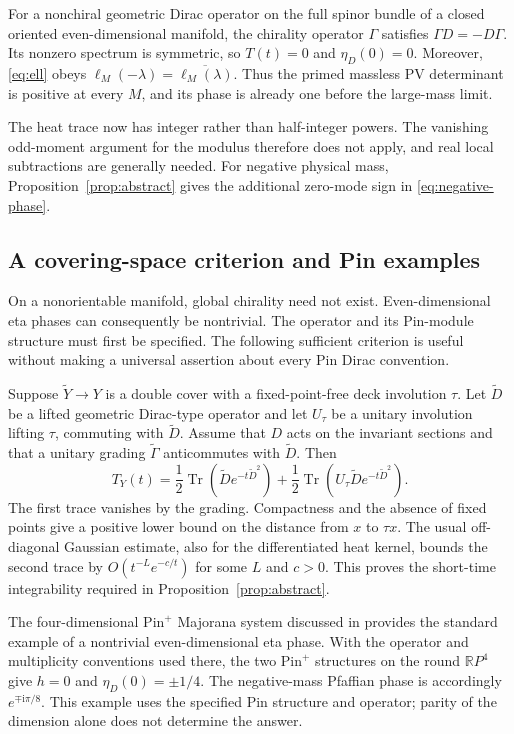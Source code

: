 \documentclass[11pt,a4paper]{article}
\theoremstyle{remark}
\DeclareMathOperator{\Tr}{Tr}
\newcommand{\ii}{\mathrm i}
\newcommand{\R}{\mathbb R}
\numberwithin{equation}{section}
\begin{document}
For a nonchiral geometric Dirac operator on the full spinor bundle
of a closed oriented even-dimensional manifold, the chirality
operator $\Gamma$ satisfies $\Gamma D=-D\Gamma$. Its nonzero
spectrum is symmetric, so $T(t)=0$ and $\eta_D(0)=0$.
Moreover, \eqref{eq:ell} obeys
$\ell_M(-\lambda)=\overline{\ell_M(\lambda)}$.
Thus the primed massless PV determinant is positive at every $M$,
and its phase is already one before the large-mass limit.

The heat trace now has integer rather than half-integer powers.
The vanishing odd-moment argument for the modulus therefore does
not apply, and real local subtractions are generally needed.
For negative physical mass, Proposition~\ref{prop:abstract} gives
the additional zero-mode sign in \eqref{eq:negative-phase}.

\subsection{A covering-space criterion and Pin examples}

On a nonorientable manifold, global chirality need not exist.
Even-dimensional eta phases can consequently be nontrivial.
The operator and its Pin-module structure must first be specified.
The following sufficient criterion is useful without making a
universal assertion about every Pin Dirac convention.

Suppose $\widetilde Y\to Y$ is a double cover with a fixed-point-free
deck involution $\tau$. Let $\widetilde D$ be a lifted geometric
Dirac-type operator and let $U_\tau$ be a unitary involution lifting
$\tau$, commuting with $\widetilde D$. Assume that $D$ acts on the
invariant sections and that a unitary grading
$\widetilde\Gamma$ anticommutes with $\widetilde D$. Then
\begin{equation}\label{eq:cover-trace}
 T_Y(t)=\frac12\Tr(\widetilde D e^{-t\widetilde D^2})
       +\frac12\Tr(U_\tau\widetilde D e^{-t\widetilde D^2}).
\end{equation}
The first trace vanishes by the grading. Compactness and the absence
of fixed points give a positive lower bound on the distance from
$x$ to $\tau x$. The usual off-diagonal Gaussian estimate, also for
the differentiated heat kernel, bounds the second trace by
$O(t^{-L}e^{-c/t})$ for some $L$ and $c>0$.
This proves the short-time integrability required in
Proposition~\ref{prop:abstract}.

The four-dimensional $\mathrm{Pin}^+$ Majorana system discussed in
\cite[Appendices A and C]{Witten} provides the standard example of
a nontrivial even-dimensional eta phase. With the operator and
multiplicity conventions used there, the two $\mathrm{Pin}^+$
structures on the round $\R P^4$ give $h=0$ and
$\eta_D(0)=\pm1/4$. The negative-mass Pfaffian phase is accordingly
$e^{\mp\ii\pi/8}$. This example uses the specified Pin structure
and operator; parity of the dimension alone does not determine the
answer.
\end{document}
